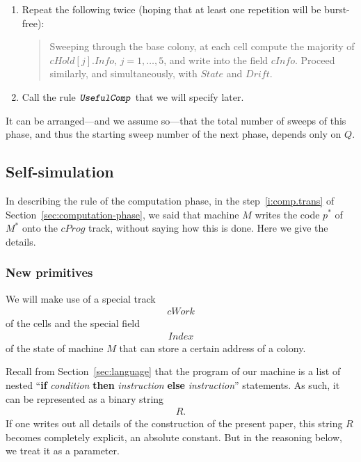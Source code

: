\documentclass[12pt]{memoir}
\newcommand{\fld}[1]{\ensuremath{\textit{#1}}}
\newcommand{\rul}[1]{\ensuremath{\texttt{\slshape #1\/}}}
\newcommand{\Drift}{\fld{Drift}}
\newcommand{\cHold}{\fld{cHold}}
\newcommand{\Index}{\fld{Index}}
\newcommand{\Info}{\fld{Info}}
\newcommand{\cInfo}{\fld{cInfo}}
\newcommand{\cProg}{\fld{cProg}}
\newcommand{\State}{\fld{State}}
\newcommand{\cWork}{\fld{cWork}}
\newcommand{\UsefulComp}{\rul{UsefulComp}}
\begin{document}
\begin{enumerate}
\begin{enumerate}
        \end{enumerate}

      \item Repeat the following twice (hoping that at least
        one repetition will be burst-free):

          \begin{quote}
            Sweeping through the base colony,
            at each cell compute the majority of \( \cHold[j].\Info \), \( j=1,\dots,5 \),
            and write into the field \( \cInfo \).
            Proceed similarly, and simultaneously, with \( \State \) and \( \Drift \).
          \end{quote}

       \item Call the rule \( \UsefulComp \) that we will specify later.
  \end{enumerate}

It can be arranged---and we assume so---that the total number of sweeps of this
phase, and thus the starting sweep number of the next phase,
depends only on \( Q \).

\subsection{Self-simulation}\label{sec:self-simulation}

In describing the rule of the computation phase,
in the step~\ref{i:comp.trans} of Section~\ref{sec:computation-phase},
we said that machine \( M \) writes the code \( p^{*} \)
of \( M^{*} \) onto the \( \cProg \) track, without saying how this is done.
Here we give the details.

\subsubsection{New primitives}

We will make use of a special track
\begin{align*}
   \cWork
 \end{align*}
of the cells and the special field
\begin{align*}
   \Index
 \end{align*}
of the state of machine \( M \) that can store a certain address of a colony.

Recall from Section~\ref{sec:language} that the program
of our machine is a list of nested
``\textbf{if} \emph{condition} \textbf{then} \emph{instruction}
\textbf{else} \emph{instruction}''
statements.
As such, it can be represented as a binary string 
 \begin{align*}
   R.
 \end{align*}
If one writes out all details of the construction of the present paper, this string \( R \)
becomes completely explicit, an absolute constant.
But in the reasoning below, we treat it as a parameter.
\end{document}
